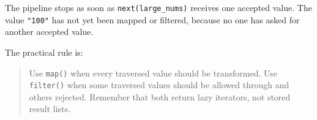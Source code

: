 The pipeline stops as soon as \texttt{next(large\_nums)} receives one accepted value. The value \texttt{"100"} has not yet been mapped or filtered, because no one has asked for another accepted value.

The practical rule is:

\begin{quote}
Use \texttt{map()} when every traversed value should be transformed. Use \texttt{filter()} when some traversed values should be allowed through and others rejected. Remember that both return lazy iterators, not stored result lists.
\end{quote}